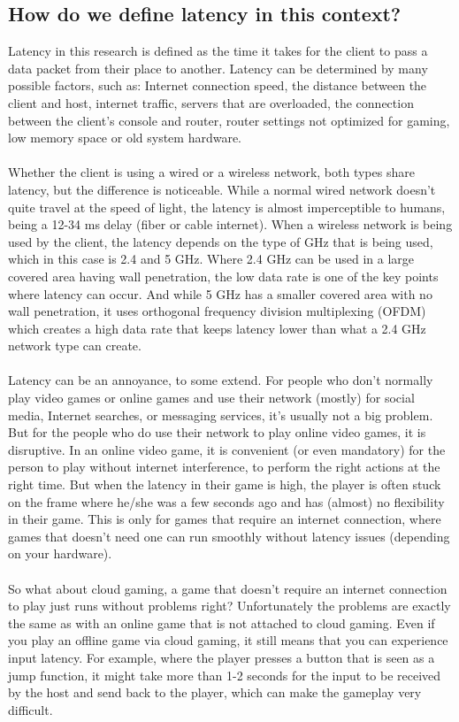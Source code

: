 \subsection{How do we define latency in this context?}
Latency in this research is defined as the time it takes for the client to pass a data packet from their place to another. Latency can be determined by many possible factors, such as: Internet connection speed, the distance between the client and host, internet traffic, servers that are overloaded, the connection between the client's console and router, router settings not optimized for gaming, low memory space or old system hardware.\\\\
Whether the client is using a wired or a wireless network, both types share latency, but the difference is noticeable. While a normal wired network doesn't quite travel at the speed of light, the latency is almost imperceptible to humans, being a 12-34 ms delay (fiber or cable internet). When a wireless network is being used by the client, the latency depends on the type of GHz that is being used, which in this case is 2.4 and 5 GHz. Where 2.4 GHz can be used in a large covered area having wall penetration, the low data rate is one of the key points where latency can occur. And while 5 GHz has a smaller covered area with no wall penetration, it uses orthogonal frequency division multiplexing (OFDM) which creates a high data rate that keeps latency lower than what a 2.4 GHz network type can create.\\\\
Latency can be an annoyance, to some extend. For people who don't normally play video games or online games and use their network (mostly) for social media, Internet searches, or messaging services, it's usually not a big problem. But for the people who do use their network to play online video games, it is disruptive. In an online video game, it is convenient (or even mandatory) for the person to play without internet interference, to perform the right actions at the right time. But when the latency in their game is high, the player is often stuck on the frame where he/she was a few seconds ago and has (almost) no flexibility in their game. This is only for games that require an internet connection, where games that doesn't need one can run smoothly without latency issues (depending on your hardware).\\\\
So what about cloud gaming, a game that doesn't require an internet connection to play just runs without problems right? Unfortunately the problems are exactly the same as with an online game that is not attached to cloud gaming. Even if you play an offline game via cloud gaming, it still means that you can experience input latency. For example, where the player presses a button that is seen as a jump function, it might take more than 1-2 seconds for the input to be received by the host and send back to the player, which can make the gameplay very difficult.

